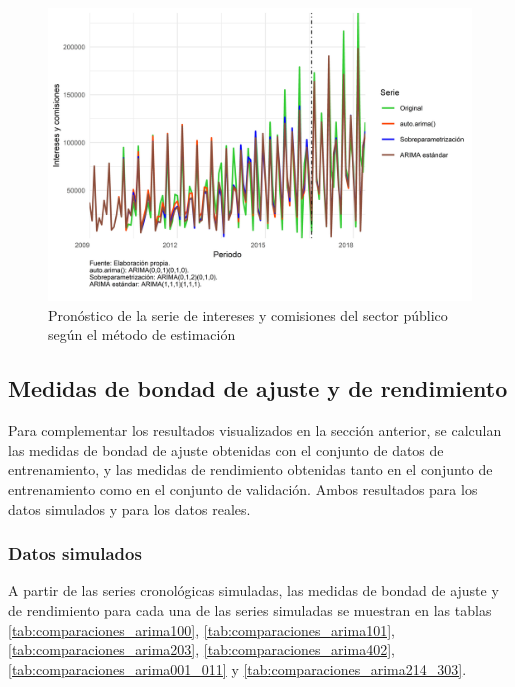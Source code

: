 \documentclass[
]{article}
\begin{document}
\begin{figure}[H]
\includegraphics[width=1\linewidth,height=1\textheight]{Tesis_files/figure-latex/pronostico_INTERESES-1} \caption{Pronóstico de la serie de intereses y comisiones del sector público según el método de estimación}\label{fig:pronostico_INTERESES}
\end{figure}

\subsection{Medidas de bondad de ajuste y de rendimiento}

Para complementar los resultados visualizados en la sección anterior, se
calculan las medidas de bondad de ajuste obtenidas con el conjunto de
datos de entrenamiento, y las medidas de rendimiento obtenidas tanto en
el conjunto de entrenamiento como en el conjunto de validación. Ambos
resultados para los datos simulados y para los datos reales.

\subsubsection{Datos simulados}

A partir de las series cronológicas simuladas, las medidas de bondad de
ajuste y de rendimiento para cada una de las series simuladas se
muestran en las tablas \ref{tab:comparaciones_arima100},
\ref{tab:comparaciones_arima101}, \ref{tab:comparaciones_arima203},
\ref{tab:comparaciones_arima402}, \ref{tab:comparaciones_arima001_011} y
\ref{tab:comparaciones_arima214_303}.
\end{document}
